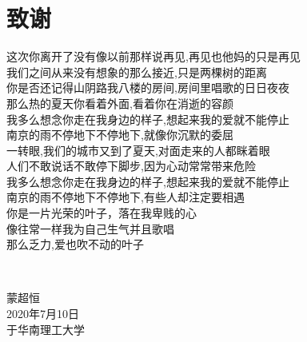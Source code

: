 \chapter{致\texorpdfstring{\quad}{}谢}
\begin{center}
这次你离开了没有像以前那样说再见,再见也他妈的只是再见 
~\\
我们之间从来没有想象的那么接近,只是两棵树的距离 
~\\
你是否还记得山阴路我八楼的房间,房间里唱歌的日日夜夜 
~\\
那么热的夏天你看着外面,看着你在消逝的容颜 
~\\
我多么想念你走在我身边的样子,想起来我的爱就不能停止 
~\\
南京的雨不停地下不停地下,就像你沉默的委屈 
~\\
一转眼,我们的城市又到了夏天,对面走来的人都眯着眼 
~\\
人们不敢说话不敢停下脚步,因为心动常常带来危险 
~\\
我多么想念你走在我身边的样子,想起来我的爱就不能停止 
~\\
南京的雨不停地下不停地下,有些人却注定要相遇 
~\\
你是一片光荣的叶子，落在我卑贱的心 
~\\
像往常一样我为自己生气并且歌唱 
~\\
那么乏力,爱也吹不动的叶子 
\end{center}

~\\

\begin{minipage}[t]{0.945\textwidth}%
	\begin{flushright}
		蒙超恒\\
		2020年7月10日\\	%
		于华南理工大学
		\par\end{flushright}
\end{minipage}

